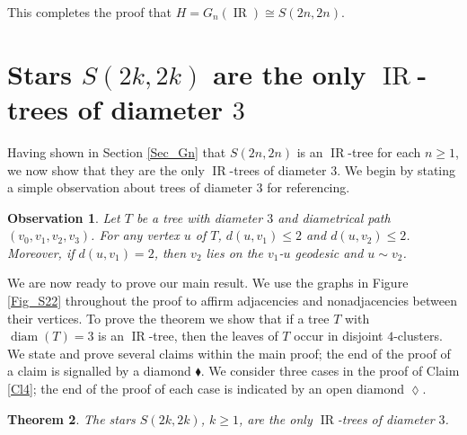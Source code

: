 \documentclass[12pt]{article}%
\newtheorem{theorem}{Theorem}
\newtheorem{observation}[theorem]{Observation}
\begin{document}
This completes the proof that $H=G_{n}(\operatorname{IR})\cong S(2n,2n)$.

\section{Stars $S(2k,2k)$ are the only $\operatorname{IR}$-trees of diameter
$3$}

\label{Sec_Only}Having shown in Section \ref{Sec_Gn} that $S(2n,2n)$ is an
$\operatorname{IR}$-tree for each $n\geq1$, we now show that they are the only
$\operatorname{IR}$-trees of diameter $3$. We begin by stating a simple
observation about trees of diameter $3$ for referencing.

\begin{observation}
\label{Diam3_tree}Let $T$ be a tree with diameter $3$ and diametrical path
$(v_{0},v_{1},v_{2},v_{3})$. For any vertex $u$ of $T$, $d(u,v_{1})\leq2$ and
$d(u,v_{2})\leq2$. Moreover, if $d(u,v_{1})=2$, then $v_{2}$ lies on the
$v_{1}$-$u$ geodesic and $u\sim v_{2}$.
\end{observation}

We are now ready to prove our main result. We use the graphs in Figure
\ref{Fig_S22} throughout the proof to affirm adjacencies and nonadjacencies
between their vertices. To prove the theorem we show that if a tree $T$ with
$\operatorname{diam}(T)=3$ is an $\operatorname{IR}$-tree, then the leaves of
$T$ occur in disjoint $4$-clusters. We state and prove several claims within
the main proof; the end of the proof of a claim is signalled by a diamond
$\blacklozenge$. We consider three cases in the proof of Claim \ref{Cl4}; the
end of the proof of each case is indicated by an open diamond $\lozenge$.

\begin{theorem}
\label{Thm_Main}The stars $S(2k,2k)$, $k\geq1$, are the only
$\operatorname{IR}$-trees of diameter $3$.
\end{theorem}
\end{document}
